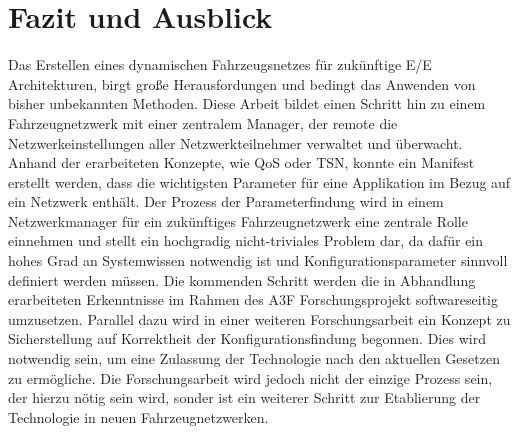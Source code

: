\section{Fazit und Ausblick}
Das Erstellen eines dynamischen Fahrzeugsnetzes für zukünftige E/E Architekturen, birgt große Herausfordungen und bedingt das Anwenden von bisher unbekannten Methoden. Diese Arbeit bildet einen Schritt hin zu einem Fahrzeugnetzwerk mit einer zentralem Manager, der remote die Netzwerkeinstellungen aller Netzwerkteilnehmer verwaltet und überwacht. Anhand der erarbeiteten Konzepte, wie QoS oder TSN, konnte ein Manifest erstellt werden, dass die wichtigsten Parameter für eine Applikation im Bezug auf ein Netzwerk enthält. Der Prozess der Parameterfindung wird in einem Netzwerkmanager für ein zukünftiges Fahrzeugnetzwerk eine zentrale Rolle einnehmen und stellt ein hochgradig nicht-triviales Problem dar, da dafür ein hohes Grad an Systemwissen notwendig ist und Konfigurationsparameter sinnvoll definiert werden müssen. Die kommenden Schritt werden die in Abhandlung erarbeiteten Erkenntnisse im Rahmen des A3F Forschungsprojekt softwareseitig umzusetzen. Parallel dazu wird in einer weiteren Forschungsarbeit ein Konzept zu Sicherstellung auf Korrektheit der Konfigurationsfindung begonnen. Dies wird notwendig sein, um eine Zulassung der Technologie nach den aktuellen Gesetzen zu ermögliche. Die Forschungsarbeit wird jedoch nicht der einzige Prozess sein, der hierzu nötig sein wird, sonder ist ein weiterer Schritt zur Etablierung der Technologie in neuen Fahrzeugnetzwerken.